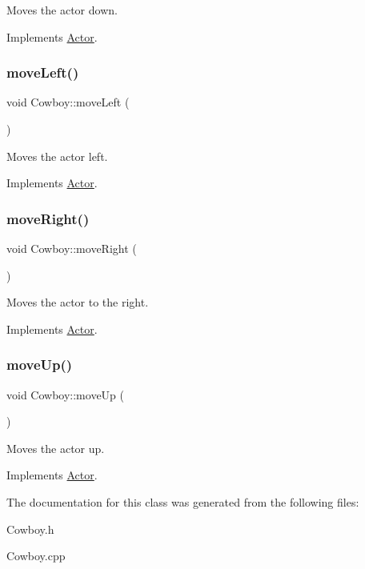 Moves the actor down. 



Implements \mbox{\hyperlink{classActor_ad2737cd62ea0c96f75853afb5d1fd83a}{Actor}}.

\mbox{\label{classCowboy_a487cf6b5d1e37586e6e9b408d2aaad1a}} 
\subsubsection{\texorpdfstring{moveLeft()}{moveLeft()}}
{\footnotesize\ttfamily void Cowboy\+::move\+Left (\begin{DoxyParamCaption}{ }\end{DoxyParamCaption})\hspace{0.3cm}{\ttfamily [virtual]}}



Moves the actor left. 



Implements \mbox{\hyperlink{classActor_a522d6069bacaa9985db7a234bde2c8b6}{Actor}}.

\mbox{\label{classCowboy_a2094d31b2535a25ef8a40945473cf884}} 
\subsubsection{\texorpdfstring{moveRight()}{moveRight()}}
{\footnotesize\ttfamily void Cowboy\+::move\+Right (\begin{DoxyParamCaption}{ }\end{DoxyParamCaption})\hspace{0.3cm}{\ttfamily [virtual]}}



Moves the actor to the right. 



Implements \mbox{\hyperlink{classActor_a9176d8f8ec68fcbd91c48223e7c65775}{Actor}}.

\mbox{\label{classCowboy_a3c4b0540c47492d02fa64b4740a35bcf}} 
\subsubsection{\texorpdfstring{moveUp()}{moveUp()}}
{\footnotesize\ttfamily void Cowboy\+::move\+Up (\begin{DoxyParamCaption}{ }\end{DoxyParamCaption})\hspace{0.3cm}{\ttfamily [virtual]}}



Moves the actor up. 



Implements \mbox{\hyperlink{classActor_afaa299f90233461ee4df96dcfda3008a}{Actor}}.



The documentation for this class was generated from the following files\+:\begin{DoxyCompactItemize}
\item 
Cowboy.\+h\item 
Cowboy.\+cpp\end{DoxyCompactItemize}
